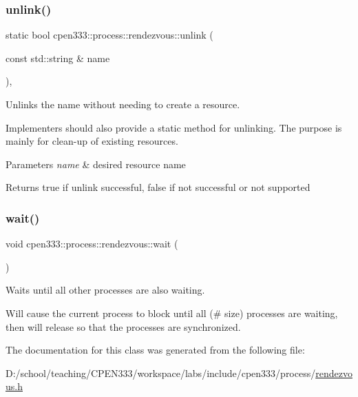\subsubsection{\texorpdfstring{unlink()}{unlink()}\hspace{0.1cm}{\footnotesize\ttfamily [2/2]}}
{\footnotesize\ttfamily static bool cpen333\+::process\+::rendezvous\+::unlink (\begin{DoxyParamCaption}\item[{const std\+::string \&}]{name }\end{DoxyParamCaption})\hspace{0.3cm}{\ttfamily [inline]}, {\ttfamily [static]}}



Unlinks the name without needing to create a resource. 

Implementers should also provide a static method for unlinking. The purpose is mainly for clean-\/up of existing resources.


\begin{DoxyParams}{Parameters}
{\em name} & desired resource name \\
\hline
\end{DoxyParams}
\begin{DoxyReturn}{Returns}
{\ttfamily true} if unlink successful, {\ttfamily false} if not successful or not supported 
\end{DoxyReturn}
\mbox{\label{classcpen333_1_1process_1_1rendezvous_a47603f8bc2aaf9302cb8132262912863}} 
\subsubsection{\texorpdfstring{wait()}{wait()}}
{\footnotesize\ttfamily void cpen333\+::process\+::rendezvous\+::wait (\begin{DoxyParamCaption}{ }\end{DoxyParamCaption})\hspace{0.3cm}{\ttfamily [inline]}}



Waits until all other processes are also waiting. 

Will cause the current process to block until all (\# size) processes are waiting, then will release so that the processes are synchronized. 

The documentation for this class was generated from the following file\+:\begin{DoxyCompactItemize}
\item 
D\+:/school/teaching/\+C\+P\+E\+N333/workspace/labs/include/cpen333/process/\hyperlink{process_2rendezvous_8h}{rendezvous.\+h}\end{DoxyCompactItemize}
